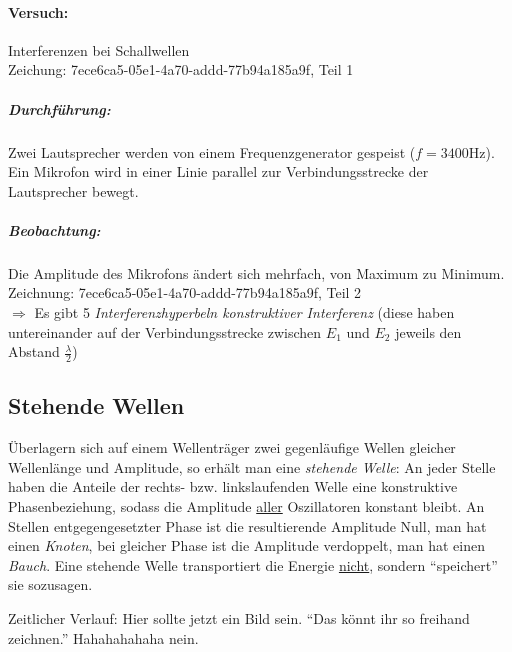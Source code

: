 \documentclass[a4paper]{scrartcl}
\begin{document}
\paragraph{Versuch:} Interferenzen bei Schallwellen\\
Zeichung: 7ece6ca5-05e1-4a70-addd-77b94a185a9f, Teil 1 %
\subparagraph{Durchführung:} Zwei Lautsprecher werden von einem
Frequenzgenerator gespeist (\(f=3400\mathrm{Hz}\)). Ein Mikrofon wird in
einer Linie parallel zur Verbindungsstrecke der Lautsprecher bewegt.
\subparagraph{Beobachtung:} Die Amplitude des Mikrofons ändert sich mehrfach,
von Maximum zu Minimum.
Zeichnung: 7ece6ca5-05e1-4a70-addd-77b94a185a9f, Teil 2\\
\(\Rightarrow\) Es gibt 5 \emph{Interferenzhyperbeln konstruktiver Interferenz}
(diese haben untereinander auf der Verbindungsstrecke zwischen \(E_1\) und
\(E_2\) jeweils den Abstand \(\frac{\lambda}{2}\))

\subsection{Stehende Wellen}
Überlagern sich auf einem Wellenträger zwei gegenläufige Wellen gleicher
Wellenlänge und Amplitude, so erhält man eine \emph{stehende Welle}:
An jeder Stelle haben die Anteile der rechts- bzw. linkslaufenden Welle eine
konstruktive Phasenbeziehung, sodass die Amplitude \underline{aller}
Oszillatoren konstant bleibt. An Stellen entgegengesetzter Phase ist die
resultierende Amplitude Null, man hat einen \emph{Knoten}, bei gleicher Phase
ist die Amplitude verdoppelt, man hat einen \emph{Bauch}. Eine stehende Welle
transportiert die Energie \underline{nicht}, sondern "`speichert"' sie
sozusagen.

Zeitlicher Verlauf: Hier sollte jetzt ein Bild sein. "`Das könnt ihr so
freihand zeichnen."' Hahahahahaha nein.
\end{document}
